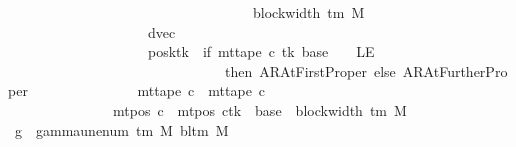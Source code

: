 \begin{isabellebody}
\ \ \ \ \ \ \ \ \ \ \ \ \ \ \ \ \ \ \ \ \ \ \ \ \ \ \ \ \ \ \ \ \ \ \ {\isacharbrackleft}{\kern0pt}{}{\isachardot}{\kern0pt}{\isachardot}{\kern0pt}{\isacharless}{\kern0pt}block{\isacharunderscore}{\kern0pt}width\ {\isacharparenleft}{\kern0pt}{\isasymGamma}{\isacharunderscore}{\kern0pt}tm\ M{\isacharparenright}{\kern0pt}\ {\isacharminus}{\kern0pt}\ {}{\isacharbrackright}{\kern0pt}{\isacharparenright}{\kern0pt}{\isacharparenright}{\kern0pt}{\isacharcomma}{\kern0pt}\isanewline
\ \ \ \ \ \ \ \ \ \ \ \ \ \ \ \ \ \ \ \ dvec{\isacharcomma}{\kern0pt}\isanewline
\ \ \ \ \ \ \ \ \ \ \ \ \ \ \ \ \ \ \ \ posk{\isacharparenleft}{\kern0pt}tk\ {\isacharcolon}{\kern0pt}{\isacharequal}{\kern0pt}\ if\ mt{\isacharunderscore}{\kern0pt}tape\ c{\isacharprime}{\kern0pt}\ tk\ {\isacharparenleft}{\kern0pt}base\ {\isacharminus}{\kern0pt}\ {}{\isacharparenright}{\kern0pt}\ {\isacharequal}{\kern0pt}\ LE{}\isanewline
\ \ \ \ \ \ \ \ \ \ \ \ \ \ \ \ \ \ \ \ \ \ \ \ \ \ \ \ \ \ \ then\ AR{\isacharunderscore}{\kern0pt}AtFirstProper\ else\ AR{\isacharunderscore}{\kern0pt}AtFurtherProper{\isacharparenright}{\kern0pt}{\isacharparenright}{\kern0pt}\isanewline
\ \ \ \ \ \ \ \ \ \ \ \ \ \ {\isasymand}\ mt{\isacharunderscore}{\kern0pt}tape\ c{\isacharprime}{\kern0pt}{\isacharprime}{\kern0pt}\ {\isacharequal}{\kern0pt}\ mt{\isacharunderscore}{\kern0pt}tape\ c{\isacharprime}{\kern0pt}\isanewline
\ \ \ \ \ \ \ \ \ \ \ \ \ \ {\isasymand}\ mt{\isacharunderscore}{\kern0pt}pos\ c{\isacharprime}{\kern0pt}{\isacharprime}{\kern0pt}\ {\isacharequal}{\kern0pt}\ {\isacharparenleft}{\kern0pt}mt{\isacharunderscore}{\kern0pt}pos\ c{\isacharprime}{\kern0pt}{\isacharparenright}{\kern0pt}{\isacharparenleft}{\kern0pt}tk\ {\isacharcolon}{\kern0pt}{\isacharequal}{\kern0pt}\ base\ {\isacharplus}{\kern0pt}\ {\isacharparenleft}{\kern0pt}block{\isacharunderscore}{\kern0pt}width\ {\isacharparenleft}{\kern0pt}{\isasymGamma}{\isacharunderscore}{\kern0pt}tm\ M{\isacharparenright}{\kern0pt}\ {\isacharminus}{\kern0pt}\ {}{\isacharparenright}{\kern0pt}{\isacharparenright}{\kern0pt}{\isachardoublequoteclose}\isanewline
%
\isadelimproof
%
\endisadelimproof
%
\isatagproof
{}\isamarkupfalse%
\ {\isacharminus}{\kern0pt}\isanewline
\ \ \isamarkupfalse%
\ {\isacharquery}{\kern0pt}g{}\ {\isacharequal}{\kern0pt}\ {\isachardoublequoteopen}gamma{\isacharunderscore}{\kern0pt}unenum\ {\isacharparenleft}{\kern0pt}{\isasymGamma}{\isacharunderscore}{\kern0pt}tm\ M{\isacharparenright}{\kern0pt}\ {\isacharparenleft}{\kern0pt}bl{\isacharunderscore}{\kern0pt}tm\ M{\isacharparenright}{\kern0pt}\ {}{\isachardoublequoteclose}\isanewline

\end{isabellebody}
